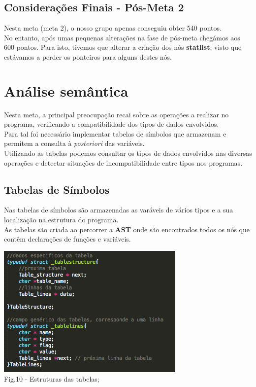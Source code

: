 \documentclass[12pt]{article}
\begin{document}
\newpage

\subsection{Considerações Finais - Pós-Meta 2}

\indent Nesta meta (meta 2), o nosso grupo apenas conseguiu obter 540 pontos.\\
\indent No entanto, após umas pequenas alterações na fase de pós-meta chegámos aos 600 pontos. Para isto, tivemos que alterar a criação dos nós \textbf{statlist}, visto que estávamos a perder os ponteiros para alguns destes nós.

\newpage


\section{Análise semântica}

\indent Nesta meta, a principal preocupação recai sobre as operações a realizar no programa, verificando a compatibilidade dos tipos de dados envolvidos.\\
\indent Para tal foi necessário implementar tabelas de símbolos que armazenam e permitem a consulta à \textit{posteriori} das variáveis.\\
\indent Utilizando as tabelas podemos consultar os tipos de dados envolvidos nas diversas operações e detectar situações de incompatibilidade entre tipos nos programas.

\subsection{Tabelas de Símbolos}

\indent Nas tabelas de símbolos são armazenadas as varáveis de vários tipos e a sua localização na estrutura do programa.\\
\indent As tabelas são criada ao percorrer a \textbf{AST} onde são encontrados todos os nós que contêm declarações de funções e variáveis.

\begin{center}
\includegraphics[scale=0.9]{table_structs.png}\\
Fig.10 - Estruturas das tabelas;
\end{center}
\end{document}
